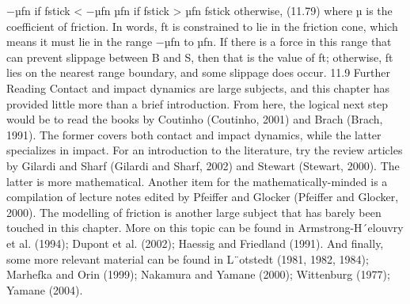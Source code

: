 −µfn if fstick < −µfn µfn if fstick > µfn fstick otherwise, (11.79) where µ is the coefficient of friction. In words, ft is constrained to lie in the friction cone, which means it must lie in the range −µfn to µfn. If there is a force in this range that can prevent slippage between B and S, then that is the value of ft; otherwise, ft lies on the nearest range boundary, and some slippage does occur. 11.9 Further Reading Contact and impact dynamics are large subjects, and this chapter has provided little more than a brief introduction. From here, the logical next step would be to read the books by Coutinho (Coutinho, 2001) and Brach (Brach, 1991). The former covers both contact and impact dynamics, while the latter specializes in impact. For an introduction to the literature, try the review articles by Gilardi and Sharf (Gilardi and Sharf, 2002) and Stewart (Stewart, 2000). The latter is more mathematical. Another item for the mathematically-minded is a compilation of lecture notes edited by Pfeiffer and Glocker (Pfeiffer and Glocker, 2000). The modelling of friction is another large subject that has barely been touched in this chapter. More on this topic can be found in Armstrong-H´elouvry et al. (1994); Dupont et al. (2002); Haessig and Friedland (1991). And finally, some more relevant material can be found in L¨otstedt (1981, 1982, 1984); Marhefka and Orin (1999); Nakamura and Yamane (2000); Wittenburg (1977); Yamane (2004).
